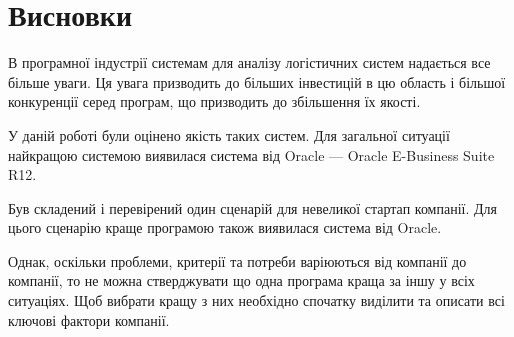 \section*{Висновки}
В програмної індустрії системам для аналізу логістичних систем надається все більше уваги.
Ця увага призводить до більших інвестицій в цю область і більшої конкуренції серед програм, що призводить до збільшення їх якості.

У даній роботі були оцінено якість таких систем.
Для загальної ситуації найкращою системою виявилася система від Oracle --- Oracle E-Business Suite R12.

Був складений і перевірений один сценарій для невеликої стартап компанії.
Для цього сценарію краще програмою також виявилася система від Oracle.

Однак, оскільки проблеми, критерії та потреби варіюються від компанії до компанії, то не можна стверджувати що одна програма краща за іншу у всіх ситуаціях.
Щоб вибрати кращу з них необхідно спочатку виділити та описати всі ключові фактори компанії.



